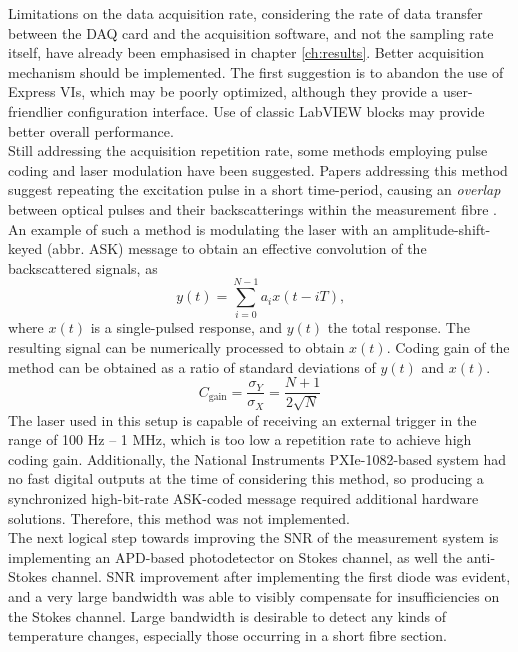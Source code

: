 \documentclass{standalone}
\begin{document}
Limitations on the data acquisition rate, considering the rate of data transfer between the DAQ card and the acquisition software, and not the sampling rate itself, have already been emphasised in chapter \ref{ch:results}. Better acquisition mechanism should be implemented. The first suggestion is to abandon the use of Express VIs, which may be poorly optimized, although they provide a user-friendlier configuration interface. Use of classic LabVIEW blocks may provide better overall performance. \\

Still addressing the acquisition repetition rate, some methods employing pulse coding and laser modulation have been suggested. Papers addressing this method suggest repeating the excitation pulse in a short time-period, causing an \textit{overlap} between optical pulses and their backscatterings within the measurement fibre \cite{coding1}\cite{coding2}\cite{coding3}\cite{coding4}. An example of such a method is modulating the laser with an amplitude-shift-keyed (abbr. ASK) message to obtain an effective convolution of the backscattered signals, as
\begin{equation}
y(t) = \sum_{i = 0}^{N-1} a_i x(t - iT) \textrm{,}
\end{equation}
where $x(t)$ is a single-pulsed response, and $y(t)$ the total response. The resulting signal can be numerically processed to obtain $x(t)$. Coding gain of the method can be obtained as a ratio of standard deviations of $y(t)$ and $x(t)$.
\begin{equation}
C_\textrm{gain} = \frac{\sigma_Y}{\sigma_X} = \frac{N+1}{2 \sqrt{N}}
\end{equation}
The laser used in this setup is capable of receiving an external trigger in the range of 100 Hz -- 1 MHz, which is too low a repetition rate to achieve high coding gain. Additionally, the National Instruments PXIe-1082-based system had no fast digital outputs at the time of considering this method, so producing a synchronized high-bit-rate ASK-coded message required additional hardware solutions. Therefore, this method was not implemented. \\

The next logical step towards improving the SNR of the measurement system is implementing an APD-based photodetector on Stokes channel, as well the anti-Stokes channel. SNR improvement after implementing the first diode was evident, and a very large bandwidth was able to visibly compensate for insufficiencies on the Stokes channel. Large bandwidth is desirable to detect any kinds of temperature changes, especially those occurring in a short fibre section.


\setcounter{stranica}{\thepage}
\addtocounter{stranica}{1}
\end{document}
